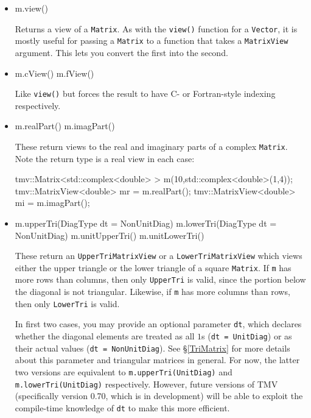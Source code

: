 \documentclass[twoside,letterpaper,11pt]{article}
\renewcommand{\tt}[1]{{\lstinline {#1}}}
\begin{document}
\begin{itemize}
\item
\begin{tmvcode}
m.view()
\end{tmvcode}
Returns a view of a \tt{Matrix}.  As with the \tt{view()} function for a \tt{Vector}, it is mostly
useful for passing a \tt{Matrix} to a function that takes a \tt{MatrixView} argument.  
This lets you convert the first into the second.

\item
\begin{tmvcode}
m.cView()
m.fView()
\end{tmvcode}
Like \tt{view()} but forces the result to have C- or Fortran-style indexing respectively.

\item
\begin{tmvcode}
m.realPart()
m.imagPart()
\end{tmvcode}
These return views to the real and imaginary parts of a complex \tt{Matrix}.
Note the return type is a real view in each case:
\begin{tmvcode}
tmv::Matrix<std::complex<double> > m(10,std::complex<double>(1,4));
tmv::MatrixView<double> mr = m.realPart();
tmv::MatrixView<double> mi = m.imagPart();
\end{tmvcode}

\item
\begin{tmvcode}
m.upperTri(DiagType dt = NonUnitDiag)
m.lowerTri(DiagType dt = NonUnitDiag)
m.unitUpperTri()
m.unitLowerTri()
\end{tmvcode}
These return an \tt{UpperTriMatrixView} or a \tt{LowerTriMatrixView} which
views either the upper triangle or the lower triangle of a square \tt{Matrix}.
If \tt{m} has more rows than columns, then only \tt{UpperTri} is valid, since
the portion below the diagonal is not triangular.
Likewise, if \tt{m} has more columns than rows, then only \tt{LowerTri} is valid.

In first two cases, you may provide an optional parameter \tt{dt}, which
declares whether the diagonal elements are treated as all $1$s
(\tt{dt = UnitDiag}) or as their actual values (\tt{dt = NonUnitDiag}). 
See \S\ref{TriMatrix} for more details about this parameter and
triangular matrices in general.
For now, the latter two versions are equivalent to \tt{m.upperTri(UnitDiag)} and 
\tt{m.lowerTri(UnitDiag)} respectively.  However, future versions of TMV
(specifically version 0.70, which is in development) will be able to exploit
the compile-time knowledge of \tt{dt} to make this more efficient.

\end{itemize}
\end{document}
